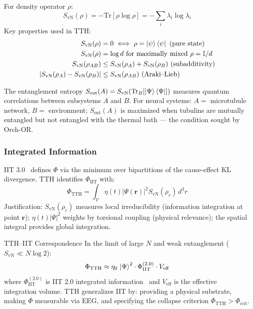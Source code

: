 \documentclass[12pt,a4paper]{article}
\newcommand{\phicrit}{\Phi_{\mathrm{crit}}}
\newcommand{\phiTTH}{\Phi_{\mathrm{TTH}}}
\newcommand{\phiIIT}{\Phi_{\mathrm{IIT}}}
\newcommand{\SvN}{S_{\mathrm{vN}}}
\newcommand{\etacoupl}{\eta(t)}
\numberwithin{equation}{section}
\begin{document}
For density operator $\rho$:
\begin{equation}
  \SvN(\rho) = -\mathrm{Tr}[\rho\log\rho] = -\sum_i\lambda_i\log\lambda_i
  \label{eq:vN_entropy}
\end{equation}
Key properties used in TTH:
\begin{align}
  \SvN(\rho) &= 0 \iff \rho = \Ket\psi\Bra\psi \text{ (pure state)} \label{eq:vN_pure}\\
  \SvN(\rho) &= \log d \text{ for maximally mixed } \rho = \mathbb{I}/d \label{eq:vN_mixed}\\
  \SvN(\rho_{AB}) &\leq \SvN(\rho_A) + \SvN(\rho_B) \text{ (subadditivity)} \label{eq:subadditivity}\\
  |\SvN(\rho_A) - \SvN(\rho_B)| &\leq \SvN(\rho_{AB}) \text{ (Araki--Lieb)} \label{eq:araki_lieb}
\end{align}

The entanglement entropy $S_{\mathrm{ent}}(A) = \SvN(\mathrm{Tr}_B[\Ket\Psi\Bra\Psi])$
measures quantum correlations between subsystems $A$ and $B$.
For neural systems: $A = $ microtubule network, $B = $ environment;
$S_{\mathrm{ent}}(A)$ is maximized when tubulins are mutually entangled
but not entangled with the thermal bath --- the condition sought by Orch-OR.

\subsubsection{Integrated Information}

IIT 3.0~\citep{Oizumi2014} defines $\Phi$ via the minimum over bipartitions
of the cause-effect KL divergence. TTH identifies $\phiIIT$ with:
\begin{equation}
  \phiTTH = \int_\mathcal{V}\etacoupl|\Psi(\mathbf{r})|^2\SvN(\rho_r)\,d^3r
  \label{eq:phi_TTH_def}
\end{equation}
Justification: $\SvN(\rho_r)$ measures local irreducibility (information integration
at point $\mathbf{r}$); $\etacoupl|\Psi|^2$ weights by torsional coupling (physical
relevance); the spatial integral provides global integration.

\begin{proposition}{TTH--IIT Correspondence}{}
In the limit of large $N$ and weak entanglement ($\SvN \ll N\log 2$):
\begin{equation}
  \phiTTH \approx \eta_0\,\Ket{\Psi}^2\cdot\phiIIT^{(2.0)} \cdot V_{\mathrm{eff}}
  \label{eq:IIT_correspondence}
\end{equation}
where $\phiIIT^{(2.0)}$ is IIT 2.0 integrated information~\citep{Tononi2008}
and $V_{\mathrm{eff}}$ is the effective integration volume.
TTH generalizes IIT by: providing a physical substrate,
making $\Phi$ measurable via EEG,
and specifying the collapse criterion $\phiTTH > \phicrit$.
\end{proposition}
\end{document}
